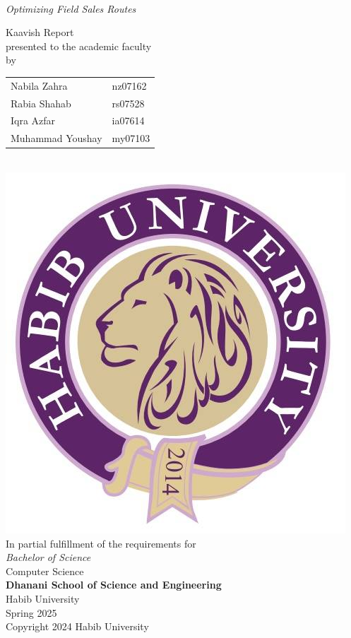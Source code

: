 \begin{titlepage}
  
  \begin{center}
    \vfill
    \textbf{\Huge \Title} \\
    {\Large \textit{Optimizing Field Sales Routes}}


    \bigskip
   
    {\large Kaavish Report\\
      presented to the academic faculty\\
      by\\\bigskip
      \begin{tabular}{ll}
        Nabila Zahra & nz07162\\
        Rabia Shahab & rs07528\\
        Iqra Azfar & ia07614\\
        Muhammad Youshay & my07103\\
      \end{tabular}
    }\\\bigskip\bigskip\bigskip
    \includegraphics[width=.4\textwidth]{images/HU.jpg}\\
    {\large In partial fulfillment of the requirements for\\
      \textit{Bachelor of Science}\\
      Computer Science\\\medskip
      \textbf{Dhanani School of Science and Engineering}\\\medskip
      Habib University\\\smallskip
      Spring 2025
    }\\\vfill
    Copyright {\scriptsize \textcopyright} 2024 Habib University
  \end{center}
  \restoregeometry
\end{titlepage}

